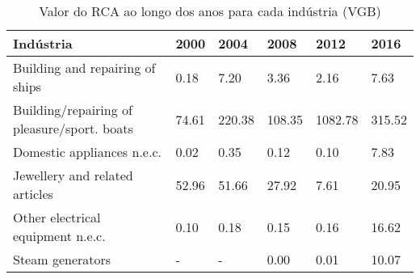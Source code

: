 \begin{table}
\centering
\caption{Valor do RCA ao longo dos anos para cada indústria (VGB)}
\begin{tabular}{p{6cm}p{1.5cm}p{1.5cm}p{1.5cm}p{1.5cm}p{1.5cm}}
\toprule
                                  Indústria &  2000 &   2004 &   2008 &    2012 &   2016 \\
\midrule
            Building and repairing of ships &  0.18 &   7.20 &   3.36 &    2.16 &   7.63 \\
Building/repairing of pleasure/sport. boats & 74.61 & 220.38 & 108.35 & 1082.78 & 315.52 \\
                 Domestic appliances n.e.c. &  0.02 &   0.35 &   0.12 &    0.10 &   7.83 \\
             Jewellery and related articles & 52.96 &  51.66 &  27.92 &    7.61 &  20.95 \\
          Other electrical equipment n.e.c. &  0.10 &   0.18 &   0.15 &    0.16 &  16.62 \\
                           Steam generators &     - &      - &   0.00 &    0.01 &  10.07 \\
\bottomrule
\end{tabular}
\end{table}
